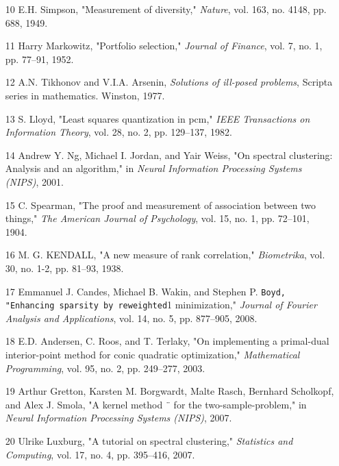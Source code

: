 \documentclass{article}
\begin{document}
\begin{itemize}
\item 
[10] E.H. Simpson, "Measurement of diversity," \textit{Nature}, vol. 163, no. 4148, pp. 688, 1949.

\item 
[11] Harry Markowitz, "Portfolio selection," \textit{Journal of Finance}, vol. 7, no. 1, pp. 77–91, 1952.

\item 
[12] A.N. Tikhonov and V.I.A. Arsenin, \textit{Solutions of ill-posed problems}, Scripta series in mathematics. Winston, 1977.

\item 
[13] S. Lloyd, "Least squares quantization in pcm," \textit{IEEE Transactions on Information Theory}, vol. 28, no. 2, pp. 129–137, 1982.

\item 
[14] Andrew Y. Ng, Michael I. Jordan, and Yair Weiss, "On spectral clustering: Analysis and an algorithm," in \textit{Neural Information Processing Systems (NIPS)}, 2001.

\item 
[15] C. Spearman, "The proof and measurement of association between two things," \textit{The American Journal of Psychology}, vol. 15, no. 1, pp. 72–101, 1904.

\item 
[16] M. G. KENDALL, "A new measure of rank correlation," \textit{Biometrika}, vol. 30, no. 1-2, pp. 81–93, 1938.

\item 
[17] Emmanuel J. Candes, Michael B. Wakin, and Stephen P. \verb|Boyd, "Enhancing sparsity by reweighted|1 minimization," \textit{Journal of Fourier Analysis and Applications}, vol. 14, no. 5, pp. 877–905, 2008.

\item 
[18] E.D. Andersen, C. Roos, and T. Terlaky, "On implementing a primal-dual interior-point method for conic quadratic optimization," \textit{Mathematical Programming}, vol. 95, no. 2, pp. 249–277, 2003.

\item 
[19] Arthur Gretton, Karsten M. Borgwardt, Malte Rasch, Bernhard Scholkopf, and Alex J. Smola, "A kernel method ¨ for the two-sample-problem," in \textit{Neural Information Processing Systems (NIPS)}, 2007.

\item 
[20] Ulrike Luxburg, "A tutorial on spectral clustering," \textit{Statistics and Computing}, vol. 17, no. 4, pp. 395–416, 2007.


\end{itemize}
\end{document}
